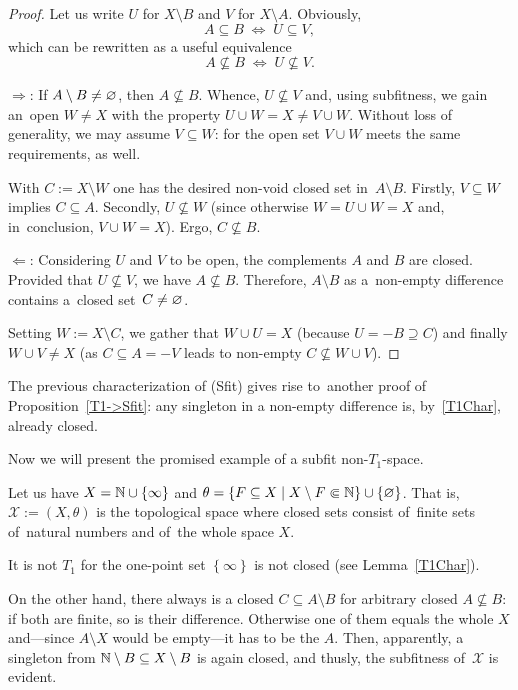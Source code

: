 \begin{proof}
  Let us write $U$ for $X\setminus B$ and $V$ for $X\setminus A$.
  Obviously,
  \[
    A\subseteq B \; \Leftrightarrow \; U\subseteq V,
  \]
  which can be rewritten as a useful equivalence
  \[
    A\not\subseteq B \; \Leftrightarrow \; U\not\subseteq V.
  \]

  $\Rightarrow$: If $A\setminus B \ne \varnothing$, then $A\not\subseteq B$.
  Whence, $U\not\subseteq V$ and, using subfitness, we gain an~open $W \ne X$
  with the property $U \cup W = X \ne V \cup W$. 
  Without loss of generality, we may assume $V\subseteq W$: for the open set $V
  \cup W$ meets the same requirements, as well.

  With $C := X \setminus W$ one has the desired non-void closed set
  in~$A\setminus B$.
  Firstly, $V\subseteq W$ implies $C\subseteq A$.
  Secondly, $U\not\subseteq W$ (since otherwise $W = U \cup W = X$ and,
  in~conclusion, $V \cup W = X$).
  Ergo, $C\not\subseteq B$.

  $\Leftarrow$: Considering $U$ and $V$ to be open, the complements $A$ and $B$
  are closed.
  Provided that $U\not\subseteq V$, we have $A\not\subseteq B$.
  Therefore, $A \setminus B$ as a~non-empty difference contains a~closed
  set~$C \ne \varnothing$.

  Setting $W := X \setminus C$, we gather that $W \cup U = X$ (because $U =
  \minus B \supseteq C$) and finally $W \cup V \ne X$ (as $C\subseteq A =
  \minus V$ leads to non-empty $C\not\subseteq W \cup V$).
\end{proof}

\begin{rem}
  The previous characterization of (Sfit) gives rise to~another proof of
  Proposition~\ref{T1->Sfit}\thinspace:
  any singleton in a non-empty difference is, by~\ref{T1Char}\thinspace,
  already closed.
\end{rem}

Now we will present the promised example of a subfit non-$T_1$-space.

\begin{exmpl}
  Let us have $X = \mathbb{N} \cup \left\{\infty\right\}$ and $\theta = \left\{
  F\subseteq X \mid X\setminus F \Subset \mathbb{N} \right\} \cup \left\{ \varnothing
  \right\}$.
  That is, $\mathcal{X} := (X, \theta)$ is the topological space where closed
  sets consist of~finite sets of~natural numbers and of~the whole space $X$.

  It is not $T_1$ for the one-point set $\left\{ \infty \right\}$ is not
  closed (see Lemma~\ref{T1Char}\thinspace).

  On the other hand, there always is a closed $C \subseteq A\setminus B$ for
  arbitrary closed $A\not\subseteq B$:
  if both are finite, so is their difference.
  Otherwise one of them equals the whole $X$ and---since $A\setminus X$ would
  be empty---it has to be the $A$.
  Then, apparently, a singleton from $\mathbb{N}\setminus B \subseteq X\setminus B$ is
  again closed, and thusly, the subfitness of~$\mathcal{X}$ is evident.
\end{exmpl}
